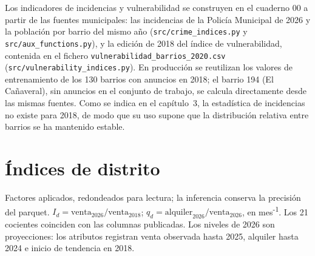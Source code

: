 \documentclass[11pt,a4paper]{article}
\newcounter{anexo}
\begin{document}
Los indicadores de incidencias y vulnerabilidad se construyen en el cuaderno 00 a partir de las fuentes municipales: las incidencias de la Policía Municipal de 2026 y la población por barrio del mismo año (\texttt{src/crime\_indices.py} y \texttt{src/aux\_functions.py}), y la edición de 2018 del índice de vulnerabilidad, contenida en el fichero \texttt{vulnerabilidad\_barrios\_2020.csv} (\texttt{src/vulnerability\_indices.py}). En producción se reutilizan los valores de entrenamiento de los 130 barrios con anuncios en 2018; el barrio 194 (El Cañaveral), sin anuncios en el conjunto de trabajo, se calcula directamente desde las mismas fuentes. Como se indica en el capítulo~3, la estadística de incidencias no existe para 2018, de modo que su uso supone que la distribución relativa entre barrios se ha mantenido estable.

\clearpage{}\label{anx:\theanexo}%
\section*{\theanexo\hspace{0.6em}Índices de distrito}

Factores aplicados, redondeados para lectura; la inferencia conserva la precisión del parquet. $I_d = \text{venta}_{2026} / \text{venta}_{2018}$; $q_d = \text{alquiler}_{2026} / \text{venta}_{2026}$, en mes\textsuperscript{-1}. Los 21 cocientes coinciden con las columnas publicadas. Los niveles de 2026 son proyecciones: los atributos registran venta observada hasta 2025, alquiler hasta 2024 e inicio de tendencia en 2018.
\end{document}
